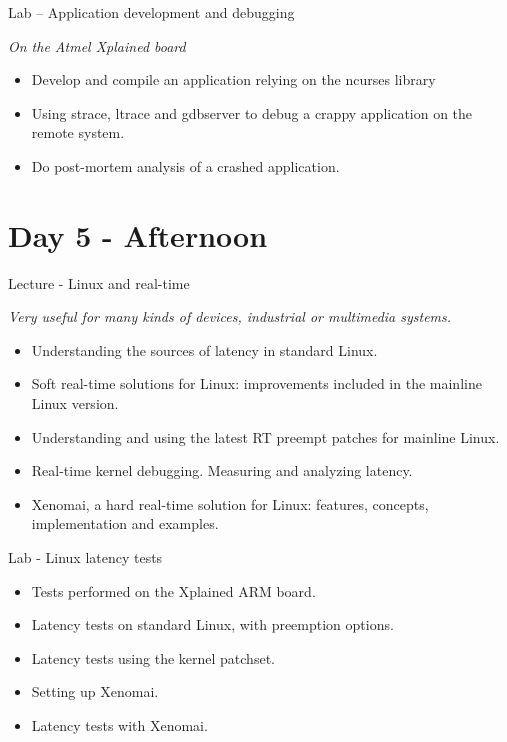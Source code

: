 \documentclass[a4paper,12pt,obeyspaces,spaces,hyphens]{article}
\begin{document}
\feagendaonecolumn
{Lab – Application development and debugging}
{
  {\em On the Atmel Xplained board}
  \begin{itemize}
  \item Develop and compile an application relying on the ncurses library
  \item Using strace, ltrace and gdbserver to debug a crappy application
        on the remote system.
  \item Do post-mortem analysis of a crashed application.
  \end{itemize}
}


\section{Day 5 - Afternoon}

\feagendaonecolumn
{Lecture - Linux and real-time}
{
  {\em Very useful for many kinds of devices, industrial or multimedia systems.}
  \begin{itemize}
  \item Understanding the sources of latency in standard Linux.
  \item Soft real-time solutions for Linux: improvements included
        in the mainline Linux version.
  \item Understanding and using the latest RT preempt patches for
        mainline Linux.
  \item Real-time kernel debugging. Measuring and analyzing latency.
  \item Xenomai, a hard real-time solution for Linux: features, concepts,
        implementation and examples.
  \end{itemize}
}

\feagendaonecolumn
{Lab - Linux latency tests}
{
  \begin{itemize}
  \item Tests performed on the Xplained ARM board.
  \item Latency tests on standard Linux, with preemption options.
  \item Latency tests using the  kernel patchset.
  \item Setting up Xenomai.
  \item Latency tests with Xenomai.
  \end{itemize}
}
\end{document}
